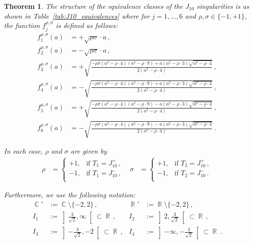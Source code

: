 \documentclass[noend]{amsproc}
\newtheorem{theorem}{Theorem}
\theoremstyle{definition}
\DeclareMathOperator{\R}{\mathbb{R}}
\DeclareMathOperator{\C}{\mathbb{C}}
\begin{document}
\begin{theorem}
The structure of the equivalence classes of the $J_{10}$ singularities is as
shown in Table~\ref{tab:J10_equivalences} where for $j = 1, \ldots, 6$ and
$\rho, \sigma \in \{-1, +1\}$, the function $f_j^{\rho, \sigma}$ is defined as
follows:
\begin{align*}
f_1^{\rho, \sigma}(a) &= +\sqrt{\rho \sigma} \cdot a \,, \\
f_2^{\rho, \sigma}(a) &= -\sqrt{\rho \sigma} \cdot a \,, \\
f_3^{\rho, \sigma}(a)
&= + \sqrt{\frac{-\rho \sigma (a^2-\rho \cdot 4) (a^2-\rho \cdot 9)
    + a (a^2-\rho \cdot 3) \sqrt{a^2-\rho \cdot 4}}{2(a^2-\rho \cdot 4)}}\,, \\
f_4^{\rho, \sigma}(a)
&= - \sqrt{\frac{-\rho \sigma (a^2-\rho \cdot 4) (a^2-\rho \cdot 9)
    + a (a^2-\rho \cdot 3) \sqrt{a^2-\rho \cdot 4}}{2(a^2-\rho \cdot 4)}}\,, \\
f_5^{\rho, \sigma}(a)
&= + \sqrt{\frac{-\rho \sigma (a^2-\rho \cdot 4) (a^2-\rho \cdot 9)
    - a (a^2-\rho \cdot 3) \sqrt{a^2-\rho \cdot 4}}{2(a^2-\rho \cdot 4)}}\,, \\
f_6^{\rho, \sigma}(a)
&= - \sqrt{\frac{-\rho \sigma (a^2-\rho \cdot 4) (a^2-\rho \cdot 9)
    - a (a^2-\rho \cdot 3) \sqrt{a^2-\rho \cdot 4}}{2(a^2-\rho \cdot 4)}}\,.
\end{align*}

In each case, $\rho$ and $\sigma$ are given by
\begin{align*}
\rho &=
\begin{cases}
    +1, &\text{if } T_1 = J_{10}^+ \,, \\
    -1, &\text{if } T_1 = J_{10}^- \,, \\
\end{cases}
&\sigma &=
\begin{cases}
    +1, &\text{if } T_2 = J_{10}^+ \,, \\
    -1, &\text{if } T_2 = J_{10}^- \,. \\
\end{cases}
\end{align*}

Furthermore, we use the following notation:
\begin{align*}
\C'  &:= \C \setminus \{ -2, 2\}         \,, &
\R'  &:= \R \setminus \{ -2, 2\}         \,, \\
I_1 &:= \left] {\textstyle\frac{3}{\sqrt{2}}}, \infty \right[ \subset \R \,, &
I_2 &:= \left] 2, {\textstyle\frac{3}{\sqrt{2}}} \right[ \subset \R      \,, \\
I_3 &:= \left] {\textstyle-\frac{3}{\sqrt{2}}}, -2 \right[ \subset \R    \,, &
I_4 &:= \left] -\infty, {\textstyle-\frac{3}{\sqrt{2}}} \right[ \subset \R \,.
\end{align*}


\end{theorem}
\end{document}

